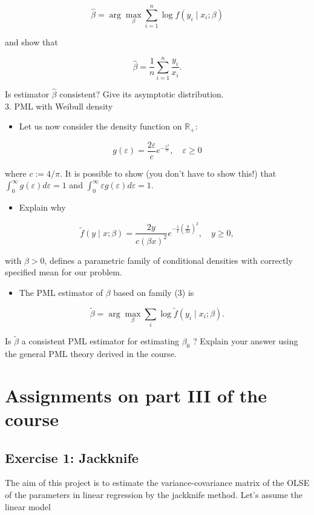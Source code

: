 $$
\hat{\beta}=\arg \max _{\beta} \sum_{i=1}^{n} \log f\left(y_{i} \mid x_{i} ; \beta\right)
$$

and show that

$$
\hat{\beta}=\frac{1}{n} \sum_{i=1}^{n} \frac{y_{i}}{x_{i}} .
$$

Is estimator $\hat{\beta}$ consistent? Give its asymptotic distribution.\\
3. PML with Weibull density

\begin{itemize}
  \item Let us now consider the density function on $\mathbb{R}_{+}$:
\end{itemize}

$$
g(\varepsilon)=\frac{2 \varepsilon}{c} e^{-\frac{\varepsilon^{2}}{c}}, \quad \varepsilon \geq 0
$$

where $c:=4 / \pi$. It is possible to show (you don't have to show this!) that $\int_{0}^{\infty} g(\varepsilon) d \varepsilon=1$ and $\int_{0}^{\infty} \varepsilon g(\varepsilon) d \varepsilon=1$.

\begin{itemize}
  \item Explain why
\end{itemize}


\begin{equation}
\tilde{f}(y \mid x ; \beta)=\frac{2 y}{c(\beta x)^{2}} e^{-\frac{1}{c}\left(\frac{y}{\beta x}\right)^{2}}, \quad y \geq 0, \label{eq:tilde}
\end{equation}


with $\beta>0$, defines a parametric family of conditional densities with correctly specified mean for our problem.

\begin{itemize}
  \item The PML estimator of $\beta$ based on family (3) is
\end{itemize}

$$
\tilde{\beta}=\arg \max _{\beta} \sum_{i} \log \tilde{f}\left(y_{i} \mid x_{i} ; \beta\right) .
$$

Is $\tilde{\beta}$ a consistent PML estimator for estimating $\beta_{0}$ ? Explain your answer using the general PML theory derived in the course.

\section{Assignments on part III of the course}
\subsection{Exercise 1: Jackknife}
The aim of this project is to estimate the variance-covariance matrix of the OLSE of the parameters in linear regression by the jackknife method. Let's assume the linear model

